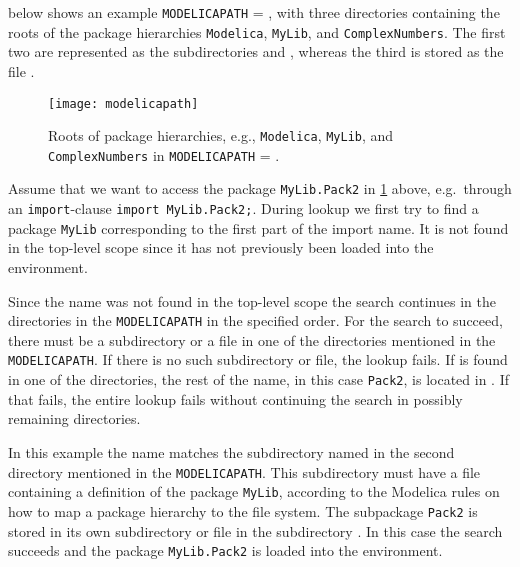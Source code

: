 \begin{example}
 below shows an example \lstinline!MODELICAPATH! = , with three
directories containing the roots of the package hierarchies \lstinline!Modelica!, \lstinline!MyLib!, and \lstinline!ComplexNumbers!.  The first two are represented as
the subdirectories  and , whereas the third is stored
as the file .

\begin{figure}[H]
  \begin{center}
    \texttt{[image: modelicapath]}
  \end{center}
  \caption{Roots of package hierarchies, e.g., \lstinline!Modelica!, \lstinline!MyLib!, and \lstinline!ComplexNumbers! in
  \lstinline!MODELICAPATH! = .}
  \label{fig:roots}
\end{figure}

Assume that we want to access the package \lstinline!MyLib.Pack2! in \cref{fig:roots} above, e.g.\ through an \lstinline!import!-clause \lstinline!import MyLib.Pack2;!.
During lookup we first try to find a package \lstinline!MyLib! corresponding to the first part of the import name.  It is not found in the top-level scope since it has not
previously been loaded into the environment.

Since the name was not found in the top-level scope the search continues in the directories in the \lstinline!MODELICAPATH! in the specified order.  For the search to succeed,
there must be a subdirectory  or a file  in one of the directories mentioned in the \lstinline!MODELICAPATH!.  If there is no such
subdirectory or file, the lookup fails.  If  is found in one of the directories, the rest of the name, in this case \lstinline!Pack2!, is located in
.  If that fails, the entire lookup fails without continuing the search in possibly remaining directories.

In this example the name matches the subdirectory named  in the second directory  mentioned in the \lstinline!MODELICAPATH!.
This subdirectory must have a file  containing a definition of the package \lstinline!MyLib!, according to the Modelica rules on how to map a package
hierarchy to the file system.  The subpackage \lstinline!Pack2! is stored in its own subdirectory or file in the subdirectory .  In this case the search
succeeds and the package \lstinline!MyLib.Pack2! is loaded into the environment.
\end{example}


